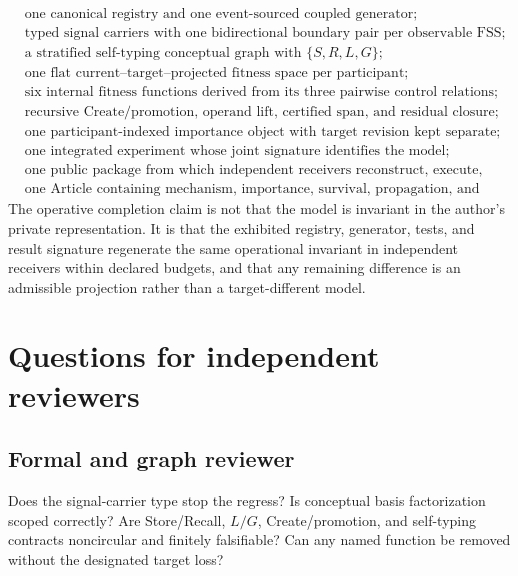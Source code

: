 \documentclass[11pt]{article}
\begin{document}
\begin{equation}
\boxed{\begin{aligned}
&\text{one canonical registry and one event-sourced coupled generator;}\\
&\text{typed signal carriers with one bidirectional boundary pair per observable FSS;}\\
&\text{a stratified self-typing conceptual graph with }\{S,R,L,G\};\\
&\text{one flat current--target--projected fitness space per participant;}\\
&\text{six internal fitness functions derived from its three pairwise control relations;}\\
&\text{recursive Create/promotion, operand lift, certified span, and residual closure;}\\
&\text{one participant-indexed importance object with target revision kept separate;}\\
&\text{one integrated experiment whose joint signature identifies the model;}\\
&\text{one public package from which independent receivers reconstruct, execute, and extend it;}\\
&\text{one Article containing mechanism, importance, survival, propagation, and history.}
\end{aligned}}
\end{equation}
The operative completion claim is not that the model is invariant in the author's private representation. It is that the exhibited registry, generator, tests, and result signature regenerate the same operational invariant in independent receivers within declared budgets, and that any remaining difference is an admissible projection rather than a target-different model.

\section{Questions for independent reviewers}

\subsection{Formal and graph reviewer}

Does the signal-carrier type stop the regress? Is conceptual basis factorization scoped correctly? Are Store/Recall, $L/G$, Create/promotion, and self-typing contracts noncircular and finitely falsifiable? Can any named function be removed without the designated target loss?
\end{document}
